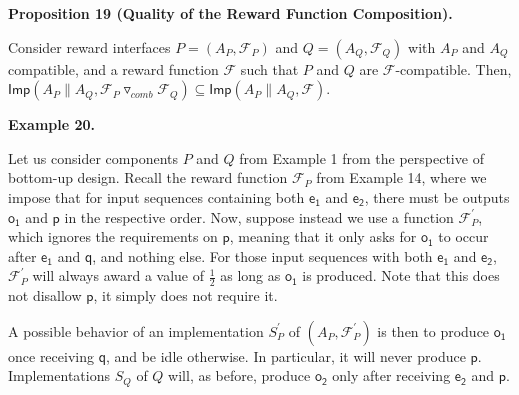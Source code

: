 \documentclass[10pt,a4paper]{article}
\begin{document}
 
 
\par\medskip\noindent\textbf{Proposition 19 (Quality of the Reward Function Composition).}\par
 
 
Consider reward interfaces $P=(A_{P},\mathcal{F}_{P})$ and $Q=(A_{Q},\mathcal{F}_{Q})$ with $A_{P}$ and $A_{Q}$ compatible, and a reward function $\mathcal{F}$ such that $P$ and $Q$ are $\mathcal{F}$-compatible. Then, $\mathsf{Imp}(A_{P}\parallel A_{Q},{{\mathcal{F}_{P}}\mathbin{\triangledown_{\mathit{comb}}}{\mathcal{F}_{Q}}})\subseteq\mathsf{Imp}(A_{P}\parallel A_{Q},\mathcal{F})$.\par
 
 
 
 
\par\medskip\noindent\textbf{Example 20.}\par
 
 
Let us consider components $P$ and $Q$ from Example 1 from the perspective of bottom-up design. Recall the reward function $\mathcal{F}_{P}$ from Example 14, where we impose that for input sequences containing both $\mathsf{e_{1}}$ and $\mathsf{e_{2}}$, there must be outputs $\mathsf{o_{1}}$ and $\mathsf{p}$ in the respective order. Now, suppose instead we use a function $\mathcal{F}_{P}^{\prime}$, which ignores the requirements on $\mathsf{p}$, meaning that it only asks for $\mathsf{o_{1}}$ to occur after $\mathsf{e_{1}}$ and $\mathsf{q}$, and nothing else. For those input sequences with both $\mathsf{e_{1}}$ and $\mathsf{e_{2}}$, $\mathcal{F}_{P}^{\prime}$ will always award a value of $\frac{1}{2}$ as long as $\mathsf{o_{1}}$ is produced. Note that this does not disallow $\mathsf{p}$, it simply does not require it.\par
 
 
 
A possible behavior of an implementation $S_{P}^{\prime}$ of $(A_{P},\mathcal{F}_{P}^{\prime})$ is then to produce $\mathsf{o_{1}}$ once receiving $\mathsf{q}$, and be idle otherwise. In particular, it will never produce $\mathsf{p}$. Implementations $S_{Q}$ of $Q$ will, as before, produce $\mathsf{o_{2}}$ only after receiving $\mathsf{e_{2}}$ and $\mathsf{p}$.\par
 
\end{document}
